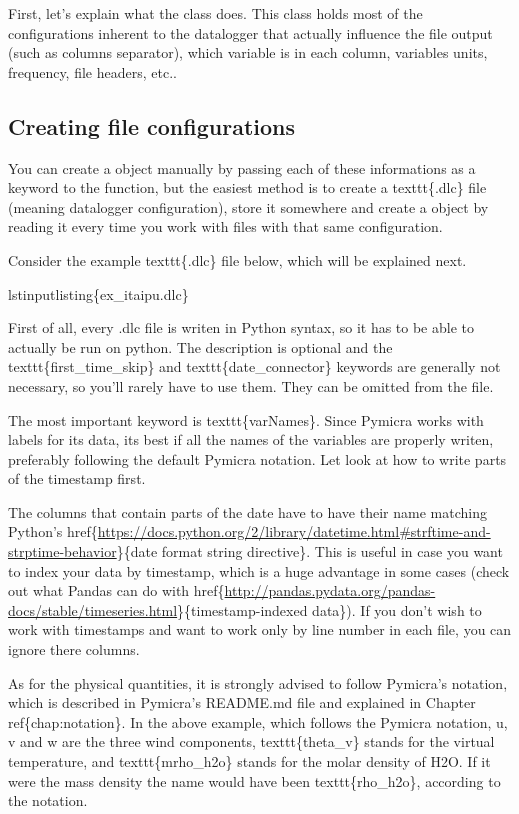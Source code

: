 \documentclass[a4paper,10pt,oneside]{sphinxmanual}
\begin{document}
First,
let's explain what the  class does. This class holds
most of the configurations inherent to the datalogger that actually influence
the file output (such as columns separator), which variable is in each column,
variables units, frequency, file headers, etc..


\subsection{Creating file configurations}
\label{tutorial:creating-file-configurations}
You can create a  object manually by passing each of
these informations as a keyword to the  function, but
the easiest method is to create a texttt\{.dlc\} file (meaning datalogger
configuration), store it somewhere and create a  object
by reading it every time you work with files with that same configuration.

Consider the example texttt\{.dlc\} file below, which will be explained next.

lstinputlisting\{ex\_itaipu.dlc\}

First of all, every .dlc file is writen in Python syntax, so it has to be able
to actually be run on python. The description is optional and the
texttt\{first\_time\_skip\} and texttt\{date\_connector\} keywords are generally
not necessary, so you'll rarely have to use them. They can be omitted from the
file.

The most important keyword is texttt\{varNames\}. Since Pymicra works with labels for its
data, its best if all the names of the variables are properly writen, preferably
following the default Pymicra notation. Let look at how to write parts of the
timestamp first.

The columns that contain parts of the date have to have their name matching
Python's
href\{\url{https://docs.python.org/2/library/datetime.html\#strftime-and-strptime-behavior}\}\{date
format string directive\}. This is useful in case you want to index your data by
timestamp, which is a huge advantage in some cases (check out what Pandas can do
with
href\{\url{http://pandas.pydata.org/pandas-docs/stable/timeseries.html}\}\{timestamp-indexed
data\}). If you don't wish to work with timestamps and want to work only by line
number in each file, you can ignore there columns.

As for the physical quantities, it is strongly advised to follow Pymicra's
notation, which is described in Pymicra's README.md file and explained in
Chapter ref\{chap:notation\}. In the above example, which follows the Pymicra
notation, u, v and w are the three wind components, texttt\{theta\_v\} stands for
the virtual temperature, and texttt\{mrho\_h2o\} stands for the molar density of
H2O. If it were the mass density the name would have been texttt\{rho\_h2o\},
according to the notation.
\end{document}
